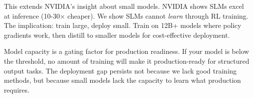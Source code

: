 \documentclass[11pt]{article}
\begin{document}
This extends NVIDIA's insight about small models.
NVIDIA shows SLMs excel at inference (10-30$\times$ cheaper).
We show SLMs cannot \emph{learn} through RL training.
The implication: train large, deploy small.
Train on 12B+ models where policy gradients work, then distill to smaller models for cost-effective deployment.

Model capacity is a gating factor for production readiness.
If your model is below the threshold, no amount of training will make it production-ready for structured output tasks.
The deployment gap persists not because we lack good training methods, but because small models lack the capacity to learn what production requires.



\end{document}
